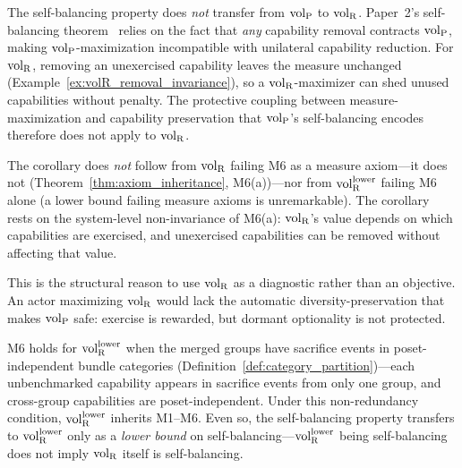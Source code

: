 \begin{corollary}
\label{cor:not_self_balancing}
The self-balancing property does \emph{not} transfer from
${\operatorname{vol}_{\mathrm{P}}}$ to ${\operatorname{vol}_{\mathrm{R}}}$.  Paper~2's self-balancing
theorem~\citep[Theorem~1]{lasser2026poset} relies on the fact
that \emph{any} capability removal contracts ${\operatorname{vol}_{\mathrm{P}}}$, making
${\operatorname{vol}_{\mathrm{P}}}$-maximization incompatible with unilateral capability
reduction.  For ${\operatorname{vol}_{\mathrm{R}}}$, removing an unexercised capability
leaves the measure unchanged
(Example~\ref{ex:volR_removal_invariance}), so a
${\operatorname{vol}_{\mathrm{R}}}$-maximizer can shed unused capabilities without penalty.
The protective coupling between measure-maximization and
capability preservation that ${\operatorname{vol}_{\mathrm{P}}}$'s self-balancing encodes
therefore does not apply to ${\operatorname{vol}_{\mathrm{R}}}$.

The corollary does \emph{not} follow from ${\operatorname{vol}_{\mathrm{R}}}$ failing M6 as
a measure axiom---it does not
(Theorem~\ref{thm:axiom_inheritance}, M6(a))---nor from
${\operatorname{vol}_{\mathrm{R}}^{\mathrm{lower}}}$ failing M6 alone (a lower bound failing measure
axioms is unremarkable).  The corollary rests on the
system-level non-invariance of M6(a): ${\operatorname{vol}_{\mathrm{R}}}$'s value depends
on which capabilities are exercised, and unexercised
capabilities can be removed without affecting that value.
\end{corollary}

This is the structural reason to use ${\operatorname{vol}_{\mathrm{R}}}$ as a diagnostic
rather than an objective.  An actor maximizing ${\operatorname{vol}_{\mathrm{R}}}$ would
lack the automatic diversity-preservation that makes ${\operatorname{vol}_{\mathrm{P}}}$
safe: exercise is rewarded, but dormant optionality is not
protected.

\begin{remark}
M6 holds for ${\operatorname{vol}_{\mathrm{R}}^{\mathrm{lower}}}$ when the merged groups have sacrifice
events in poset-independent bundle categories
(Definition~\ref{def:category_partition})---each unbenchmarked
capability appears in sacrifice events from only one group, and
cross-group capabilities are poset-independent.  Under this
non-redundancy condition, ${\operatorname{vol}_{\mathrm{R}}^{\mathrm{lower}}}$ inherits M1--M6.  Even
so, the self-balancing property transfers to ${\operatorname{vol}_{\mathrm{R}}^{\mathrm{lower}}}$ only as
a \emph{lower bound} on self-balancing---${\operatorname{vol}_{\mathrm{R}}^{\mathrm{lower}}}$ being
self-balancing does not imply ${\operatorname{vol}_{\mathrm{R}}}$ itself is self-balancing.
\end{remark}
